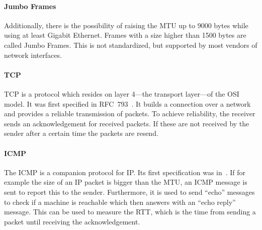 \paragraph{Jumbo Frames}
Additionally, there is the possibility of raising the \gls{MTU} up to 9000 bytes while using at least Gigabit Ethernet.
Frames with a size higher than 1500 bytes are called Jumbo Frames.
This is not standardized, but supported by most vendors of network interfaces.

\paragraph{\acrlong{TCP}}
\gls{TCP} is a protocol which resides on layer 4---the transport layer---of the \gls{OSI} model.
It was first specified in RFC~793~\cite{RFC0793}.
It builds a connection over a network and provides a reliable transmission of packets.
To achieve reliability, the receiver sends an acknowledgement for received packets.
If these are not received by the sender after a certain time the packets are resend.

\paragraph{\acrlong{ICMP}}
The \gls{ICMP} is a companion protocol for \gls{IP}.
Its first specification was in~\cite{RFC0792}.
If for example the size of an \gls{IP} packet is bigger than the \gls{MTU}, an \gls{ICMP} message is sent to report this to the sender.
Furthermore, it is used to send ``echo'' messages to check if a machine is reachable which then answers with an ``echo reply'' message.
This can be used to measure the \gls{RTT}, which is the time from sending a packet until receiving the acknowledgement.
